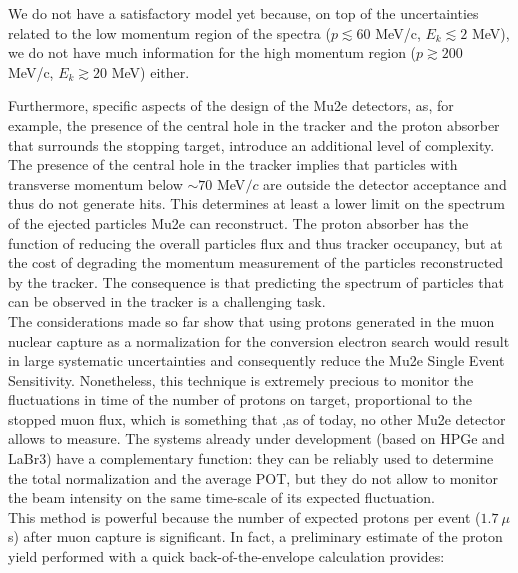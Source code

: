 \documentclass[12pt,a4paper,openright, oneside, titlepage]{book} %
\begin{document}
\noindent 
We do not have a satisfactory model yet because, 
on top of the uncertainties related to the low momentum region of the spectra
($p \lesssim 60$ MeV/c, $E_k \lesssim 2$ MeV), 
we do not have much information for the high momentum region 
($p\gtrsim200$ MeV/c, $E_k\gtrsim 20$ MeV) either.

\noindent
Furthermore,  specific aspects of the design of the Mu2e detectors, 
as, for example, the presence of the central hole in the tracker 
and the proton absorber that surrounds the stopping target, 
introduce an additional level of complexity. 
The presence of the central hole in the tracker implies that particles with transverse momentum below $\sim70$ MeV$/c$ 
are outside the detector acceptance and thus do not generate hits. 
This determines at least a lower limit on the spectrum of the ejected particles Mu2e can reconstruct. 
The proton absorber has the function of reducing the overall particles flux 
and thus tracker occupancy, but at the cost of degrading the momentum 
measurement of the particles reconstructed by the tracker. 
The consequence is that predicting the spectrum of particles 
that can be observed in the tracker is a challenging task.\\ 

\noindent 
The considerations made so far show that using protons generated in the muon nuclear capture as a normalization for the conversion electron search would result in large systematic uncertainties and consequently reduce the Mu2e Single Event Sensitivity. 
Nonetheless, this technique is extremely precious to monitor the fluctuations in time of the number of protons on target,  
proportional to the stopped muon flux, which is something that ,as of today, no other Mu2e detector allows to measure. 
The systems already under development (based on HPGe and LaBr3) have a complementary function: they can be reliably used to determine the total normalization and the average POT, but they do not allow to monitor the beam intensity on the same time-scale of its expected fluctuation.\\
This method is powerful because the number of expected protons per event ($1.7\ \mu$s) after muon capture is significant. 
In fact, a preliminary estimate of the proton yield performed with a quick back-of-the-envelope calculation provides:
\end{document}
